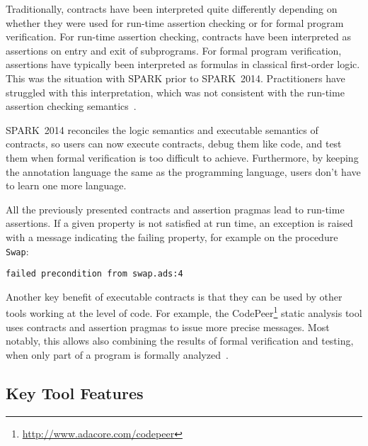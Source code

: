 \documentclass[10pt,a4paper,twocolumn]{article}
\newcommand{\newspark}{SPARK~2014\xspace}
\begin{document}
Traditionally, contracts have been interpreted quite differently
depending on whether they were used for run-time assertion checking or
for formal program verification. For run-time assertion checking,
contracts have been interpreted as assertions on entry and exit of
subprograms. For formal program verification, assertions have
typically been interpreted as formulas in classical first-order
logic. This was the situation with SPARK prior to
\newspark. Practitioners have struggled with this interpretation,
which was not consistent with the run-time assertion checking
semantics~\cite{tseChalin10}.

\newspark reconciles the logic semantics and executable semantics of
contracts, so users can now execute contracts, debug them like code,
and test them when formal verification is too difficult to
achieve. Furthermore, by keeping the annotation language the same as
the programming language, users don't have to learn one more language.

All the previously presented contracts and assertion pragmas lead to
run-time assertions. If a given property is not satisfied at run time,
an exception is raised with a message indicating the failing property,
for example on the procedure \verb|Swap|:

\begin{footnotesize}
\begin{verbatim}
failed precondition from swap.ads:4
\end{verbatim}
\end{footnotesize}


Another key benefit of executable contracts is that they can be used
by other tools working at the level of code. For example, the
CodePeer\footnote{\url{http://www.adacore.com/codepeer}} static
analysis tool uses contracts and assertion pragmas to issue more
precise messages. Most notably, this allows also combining the results
of formal verification and testing, when only part of a program is
formally analyzed~\cite{hiliteERTS2012}.

\subsection{Key Tool Features}
\end{document}
